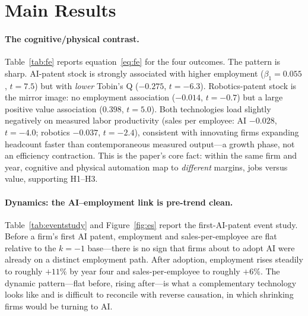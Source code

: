 \documentclass[12pt]{article}
\begin{document}
\section{Main Results}\label{sec:res}
\paragraph{The cognitive/physical contrast.} Table~\ref{tab:fe} reports equation~\eqref{eq:fe}
for the four outcomes. The pattern is sharp. AI-patent stock is strongly associated with higher
employment ($\beta_1=0.055$, $t=7.5$) but with \emph{lower} Tobin's Q ($-0.275$, $t=-6.3$).
Robotics-patent stock is the mirror image: no employment association ($-0.014$, $t=-0.7$) but a
large positive value association ($0.398$, $t=5.0$). Both technologies load slightly negatively on
measured labor productivity (sales per employee: AI $-0.028$, $t=-4.0$; robotics $-0.037$,
$t=-2.4$), consistent with innovating firms expanding headcount faster than contemporaneous
measured output---a growth phase, not an efficiency contraction. This is the paper's core fact:
within the same firm and year, cognitive and physical automation map to \emph{different} margins,
jobs versus value, supporting H1--H3.

\paragraph{Dynamics: the AI--employment link is pre-trend clean.} Table~\ref{tab:eventstudy} and
Figure~\ref{fig:es} report the first-AI-patent event study. Before a firm's first AI patent,
employment and sales-per-employee are flat relative to the $k=-1$ base---there is no sign that
firms about to adopt AI were already on a distinct employment path. After adoption, employment
rises steadily to roughly $+11\%$ by year four and sales-per-employee to roughly $+6\%$. The
dynamic pattern---flat before, rising after---is what a complementary technology looks like and is
difficult to reconcile with reverse causation, in which shrinking firms would be turning to AI.
\end{document}
